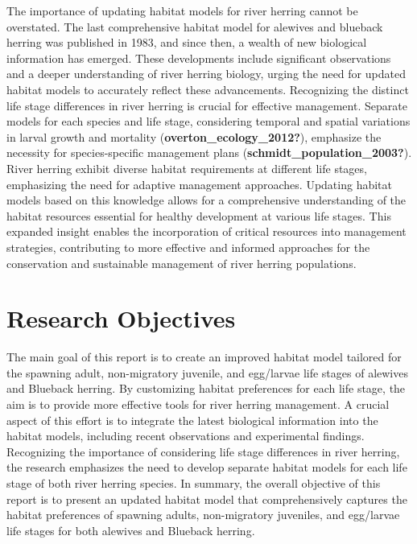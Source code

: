 \documentclass[
]{book}
\begin{document}
The importance of updating habitat models for river herring cannot be overstated. The last comprehensive habitat model for alewives and blueback herring was published in 1983, and since then, a wealth of new biological information has emerged. These developments include significant observations and a deeper understanding of river herring biology, urging the need for updated habitat models to accurately reflect these advancements. Recognizing the distinct life stage differences in river herring is crucial for effective management. Separate models for each species and life stage, considering temporal and spatial variations in larval growth and mortality (\textbf{overton\_ecology\_2012?}), emphasize the necessity for species-specific management plans (\textbf{schmidt\_population\_2003?}). River herring exhibit diverse habitat requirements at different life stages, emphasizing the need for adaptive management approaches. Updating habitat models based on this knowledge allows for a comprehensive understanding of the habitat resources essential for healthy development at various life stages. This expanded insight enables the incorporation of critical resources into management strategies, contributing to more effective and informed approaches for the conservation and sustainable management of river herring populations.

\hypertarget{research-objectives}{%
\section{Research Objectives}\label{research-objectives}}

The main goal of this report is to create an improved habitat model tailored for the spawning adult, non-migratory juvenile, and egg/larvae life stages of alewives and Blueback herring. By customizing habitat preferences for each life stage, the aim is to provide more effective tools for river herring management. A crucial aspect of this effort is to integrate the latest biological information into the habitat models, including recent observations and experimental findings. Recognizing the importance of considering life stage differences in river herring, the research emphasizes the need to develop separate habitat models for each life stage of both river herring species. In summary, the overall objective of this report is to present an updated habitat model that comprehensively captures the habitat preferences of spawning adults, non-migratory juveniles, and egg/larvae life stages for both alewives and Blueback herring.
\end{document}
